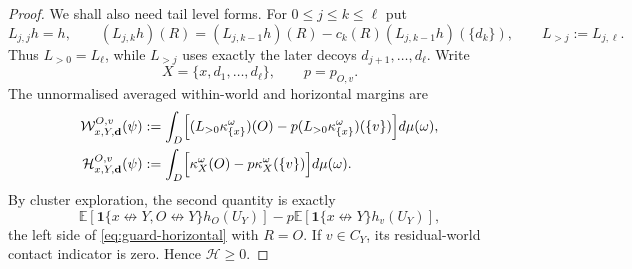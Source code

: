 \documentclass[11pt]{article}
\theoremstyle{definition}
\theoremstyle{remark}
\newcommand{\EE}{\mathbb E}
\newcommand{\one}{\mathbf 1}
\newcommand{\ncon}{\not\leftrightarrow}
\begin{document}
\begin{proof}
We shall also need tail level forms.  For $0\leq j\leq k\leq\ell$ put
\[
 L_{j,j}h=h,\qquad
 (L_{j,k}h)(R)=(L_{j,k-1}h)(R)
       -c_k(R)(L_{j,k-1}h)(\{d_k\}),
 \qquad L_{>j}:=L_{j,\ell}.
\]
Thus $L_{>0}=L_\ell$, while $L_{>j}$ uses exactly the later decoys
$d_{j+1},\ldots,d_\ell$.  Write
\[
 X=\{x,d_1,\ldots,d_\ell\},\qquad p=p_{O,v}.
\]
The unnormalised averaged within-world and horizontal margins are
\begin{align}
 \mathcal W_{x,Y,{\bf d}}^{O,v}(\psi)
   &:={\int_D}\Bigl[
       (L_{>0}\kappa^\omega_{\{x\}})(O)
       -p(L_{>0}\kappa^\omega_{\{x\}})(\{v\})\Bigr]d\mu(\omega),
       \label{eq:guard-W-def}\\
 \mathcal H_{x,Y,{\bf d}}^{O,v}(\psi)
   &:={\int_D}\Bigl[
       \kappa^\omega_X(O)-p\kappa^\omega_X(\{v\})\Bigr]d\mu(\omega).
       \label{eq:guard-H-def}
\end{align}
By cluster exploration, the second quantity is exactly
\[
 \EE[\one\{x\ncon Y,O\ncon Y\}h_O(U_Y)]
 -p\EE[\one\{x\ncon Y\}h_v(U_Y)],
\]
the left side of \eqref{eq:guard-horizontal} with $R=O$.  If
$v\in C_Y$, its residual-world contact indicator is zero.  Hence
$\mathcal H\geq0$.


\end{proof}
\end{document}
